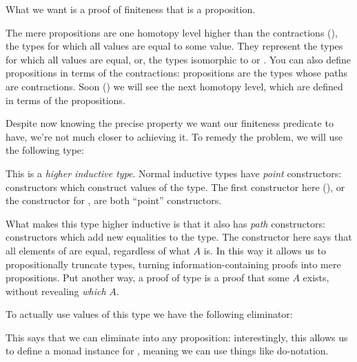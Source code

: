 What we want is a proof of finiteness that is a proposition.
\begin{agdalisting}\label{isProp}
\end{agdalisting}
The mere propositions are one homotopy level higher than the contractions
(), the types for which all values are equal to some value.
They represent the types for which all values are equal, or, the types
isomorphic to \agdabot\;or \agdatop.
You can also define propositions in terms of the contractions: propositions are
the types whose paths are contractions.
Soon () we will see the next homotopy level, which are
defined in terms of the propositions.

Despite now knowing the precise property we want our finiteness predicate to
have, we're not much closer to achieving it.
To remedy the problem, we will use the following type:
\begin{agdalisting}\label{prop-trunc}
\end{agdalisting}
This is a \emph{higher inductive type}.
Normal inductive types have \emph{point} constructors: constructors which
construct values of the type.
The first constructor here (\AgdaInductiveConstructor{\ensuremath{\lvert \_
    \rvert}}), or the constructor  for
, are both ``point'' constructors.

What makes this type higher inductive is that it also has \emph{path}
constructors: constructors which add new equalities to the type. 
The  constructor here says that all elements of
are equal, regardless of what \(A\) is.
In this way it allows us to propositionally truncate types, turning
information-containing proofs into mere propositions.
Put another way, a proof of type 
is a proof that some \(A\) exists, without revealing \emph{which} \(A\).

To actually use values of this type we have the following eliminator:
\begin{agdalisting}\label{elim-prop}
\end{agdalisting}
This says that we can eliminate into any proposition: interestingly, this allows
us to define a monad instance for \AgdaDatatype{\(\lVert \_ \rVert\)}, meaning
we can use things like do-notation.

